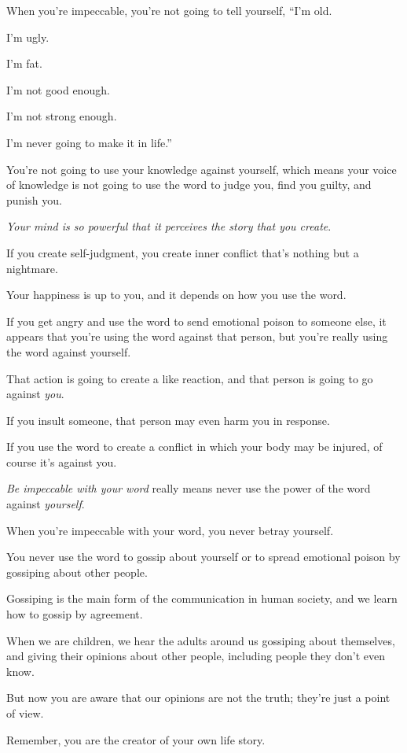 \documentclass{article}
\numberwithin{equation}{section}
\begin{document}
When you're impeccable, you're not going to tell yourself, ``I'm old.

I'm ugly.

I'm fat.

I'm not good enough.

I'm not strong enough.

I'm never going to make it in life.''

You're not going to use your knowledge against yourself, which means your voice of knowledge is not going to use the word to judge you, find you guilty, and punish you.

\textit{Your mind is so powerful that it perceives the story that you create}.

If you create self-judgment, you create inner conflict that's nothing but a nightmare.

%
Your happiness is up to you, and it depends on how you use the word.

If you get angry and use the word to send emotional poison to someone else, it appears that you're using the word against that person, but you're really using the word against yourself.

That action is going to create a like reaction, and that person is going to go against \textit{you}.

If you insult someone, that person may even harm you in response.

If you use the word to create a conflict in which your body may be injured, of course it's against you.

%
\textit{Be impeccable with your word} really means never use the power of the word against \textit{yourself}.

When you're impeccable with your word, you never betray yourself.

You never use the word to gossip about yourself or to spread emotional poison by gossiping about other people.

Gossiping is the main form of the communication in human society, and we learn how to gossip by agreement.

When we are children, we hear the adults around us gossiping about themselves, and giving their opinions about other people, including people they don't even know.

But now you are aware that our opinions are not the truth; they're just a point of view.

%
Remember, you are the creator of your own life story.
\end{document}
